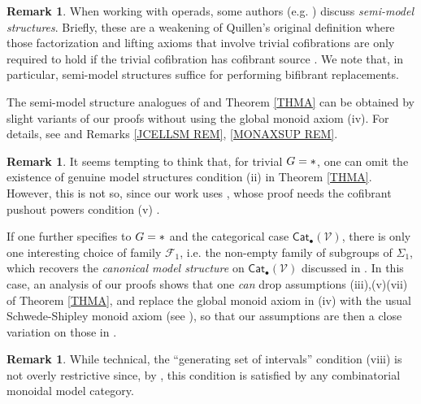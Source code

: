 \documentclass[a4paper,10pt
 ,final
]{article}%
\numberwithin{equation}{section}
\numberwithin{figure}{section}
\theoremstyle{definition} %
\newtheorem{remark}[equation]{Remark}%
\newcommand{\Cat}{\mathsf{Cat}}
\newcommand{\F}{\ensuremath{\mathcal F}}
\newcommand{\V}{\ensuremath{\mathcal V}}
\newcommand{\1}{\ensuremath{\mathbbm 1}}%
\begin{document}
\begin{remark}\label{SEMI_REM}
	When working with operads, some authors (e.g. \cite{Spi,Whi17,WY18})
	discuss \emph{semi-model structures}.
	Briefly, these are a weakening of Quillen's original definition
	where those factorization and lifting axioms
	that involve trivial cofibrations
	are only required to hold if the trivial cofibration 
	has cofibrant source \cite[\S 2.2]{WY18}.
	We note that, in particular, semi-model structures suffice for 
	performing %
	bifibrant replacements.
        
	The semi-model structure analogues of 
	\cite[Thms. \ref{OC-THMI} and \ref{OC-THMII}]{BP_FCOP}
	and Theorem \ref{THMA}
	can be obtained by slight variants of our proofs
	without using the global monoid axiom (iv).
	For details, see \cite[Rem. \ref{OC-THMISM REM}]{BP_FCOP}
	and Remarks \ref{JCELLSM REM}, \ref{MONAXSUP REM}.
\end{remark}



\begin{remark}\label{GTRIV REM}
	It seems tempting to think that, for trivial $G=\**$,
	one can omit the existence of genuine model structures condition (ii) in Theorem \ref{THMA}.
	However, this is not so, since 
	our work uses 
	\cite[Thm. \ref{OC-THMI}]{BP_FCOP},
	whose proof needs
	the cofibrant pushout powers condition (v)
	\cite[Rem. \ref{OC-GTRIV REM}]{BP_FCOP}.

	If one further specifies to 
	$G=\**$ and the categorical case $\Cat_\bullet(\V)$,
	there is only one interesting choice of family $\F_1$,
	i.e. the non-empty family of subgroups of $\Sigma_1$,
	which recovers the \emph{canonical model structure} on 
	$\Cat_\bullet(\V)$ discussed in \cite{BM13}.
	In this case, an analysis of our proofs shows that
	one \emph{can}
	drop assumptions (iii),(v)(vii) of Theorem \ref{THMA},
	and replace the global monoid axiom in (iv) 
	with the usual Schwede-Shipley
	monoid axiom \cite{SS00}
	(see \cite[Rem. \ref{OC-MONAX_REM}]{BP_FCOP}),
	so that our assumptions are then a close variation on those in \cite{BM13}.
\end{remark}

\begin{remark}
While technical, the ``generating set of intervals''
condition (viii) is not overly restrictive since, 
by \cite[Lemma 1.12]{BM13},
this condition is satisfied by any 
combinatorial monoidal model category.
\end{remark}
\end{document}

